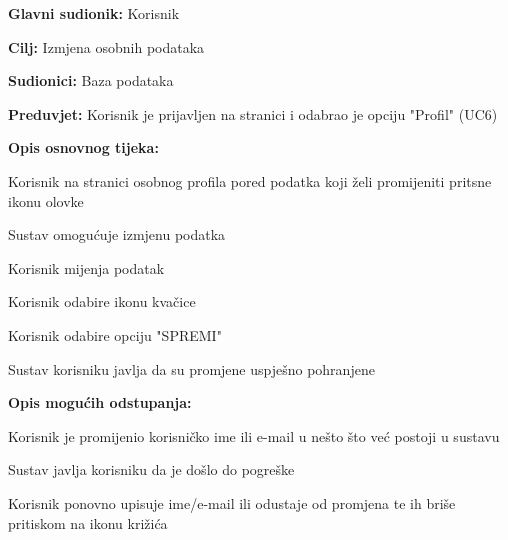 					\noindent {}
					\begin{packed_item}
	\item \textbf{Glavni sudionik:} Korisnik
	\item  \textbf{Cilj:} Izmjena osobnih podataka
	\item  \textbf{Sudionici:} Baza podataka
	\item  \textbf{Preduvjet:} Korisnik je prijavljen na stranici i odabrao je opciju "Profil" (UC6)
	\item  \textbf{Opis osnovnog tijeka:}
	
	\item[] \begin{packed_enum}
		
		\item Korisnik na stranici osobnog profila pored podatka koji želi promijeniti pritsne ikonu olovke
		\item Sustav omogućuje izmjenu podatka
		\item Korisnik mijenja podatak
		\item Korisnik odabire ikonu kvačice
		\item Korisnik odabire opciju "SPREMI"
		\item Sustav korisniku javlja da su promjene uspješno pohranjene
	\end{packed_enum}
	
	\item  \textbf{Opis mogućih odstupanja:}
	
	\item[] \begin{packed_item}
		
		\item[4.a] Korisnik je promijenio korisničko ime ili e-mail u nešto što već postoji u sustavu
		\item[] \begin{packed_enum}
			
			\item Sustav javlja korisniku da je došlo do pogreške
			\item Korisnik ponovno upisuje ime/e-mail ili odustaje od promjena te ih briše pritiskom na ikonu križića
			
		\end{packed_enum}
	\end{packed_item}
\end{packed_item}

